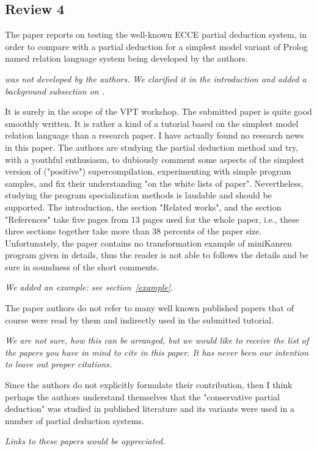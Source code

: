 
\subsection*{Review 4}

The paper reports on testing the well-known ECCE partial deduction system, in order to compare with a partial deduction for a simplest model variant of Prolog named relation language system being developed by the authors.

\emph{\mk was not developed by the authors. We clarified it in the introduction and added a background subsection on \mk. }

It is surely in the scope of the VPT workshop.
The submitted paper is quite good smoothly written.
It is rather a kind of a tutorial based on the simplest model relation language than a research paper.
I have actually found no research news in this paper.
The authors are studying the partial deduction method and try, with a youthful enthusiasm, to dubiously comment some aspects of the simplest version of ("positive") supercompilation, experimenting with simple program samples, and fix their understanding "on the white lists of paper".
Nevertheless, studying the program specialization methods is laudable and should be supported.
The introduction, the section "Related works", and the section "References" take five pages from 13 pages used for the whole paper, i.e., these three sections together take more than 38 percents of the paper size.
Unfortunately, the paper contains no transformation example of miniKanren program given in details, thus the reader is not able to follows the details and be sure in soundness of the short comments.

\emph{We added an example: see section~\ref{example}.}

The paper authors do not refer to many well known published papers that of course were read by them and indirectly used in the submitted tutorial.

\emph{We are not sure, how this can be arranged, but we would like to receive the list of the papers you have in mind to cite in this paper. It has never been our intention to leave out proper citations.}

Since the authors do not explicitly formulate their contribution, then I think perhaps the authors understand themselves that the "conservative partial deduction" was studied in published literature and its variants were used in a number of partial deduction systems.

\emph{Links to these papers would be appreciated.}

